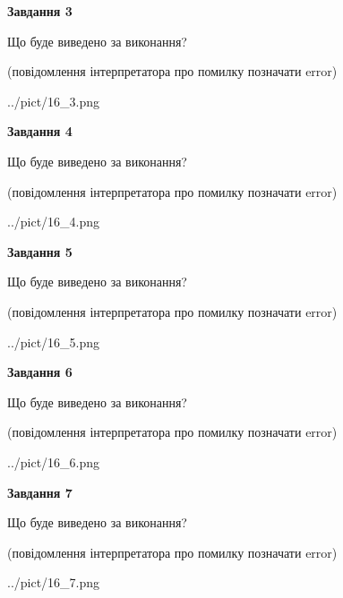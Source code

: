 \documentclass[12pt, ukrainian]{article}
\begin{document}
{\begin {large}
{\begin {center}\textbf{Завдання 3}\end {center}}\par
Що буде виведено за виконання?\par
 (повідомлення інтерпретатора про помилку позначати error)\par
\begin{center}
	{../pict/16_3.png}
\end{center}
\newpage

{\begin {center}\textbf{Завдання 4}\end {center}}\par
Що буде виведено за виконання?\par
 (повідомлення інтерпретатора про помилку позначати error)\par
\begin{center}
	{../pict/16_4.png}
\end{center}
\newpage

{\begin {center}\textbf{Завдання 5}\end {center}}\par
Що буде виведено за виконання?\par
 (повідомлення інтерпретатора про помилку позначати error)\par
\begin{center}
	{../pict/16_5.png}
\end{center}
\newpage

{\begin {center}\textbf{Завдання 6}\end {center}}\par
Що буде виведено за виконання?\par
 (повідомлення інтерпретатора про помилку позначати error)\par
\begin{center}
	{../pict/16_6.png}
\end{center}
\newpage

{\begin {center}\textbf{Завдання 7}\end {center}}\par
Що буде виведено за виконання?\par
 (повідомлення інтерпретатора про помилку позначати error)\par
\begin{center}
	{../pict/16_7.png}
\end{center}
\newpage


\end{large}}
\end{document}
